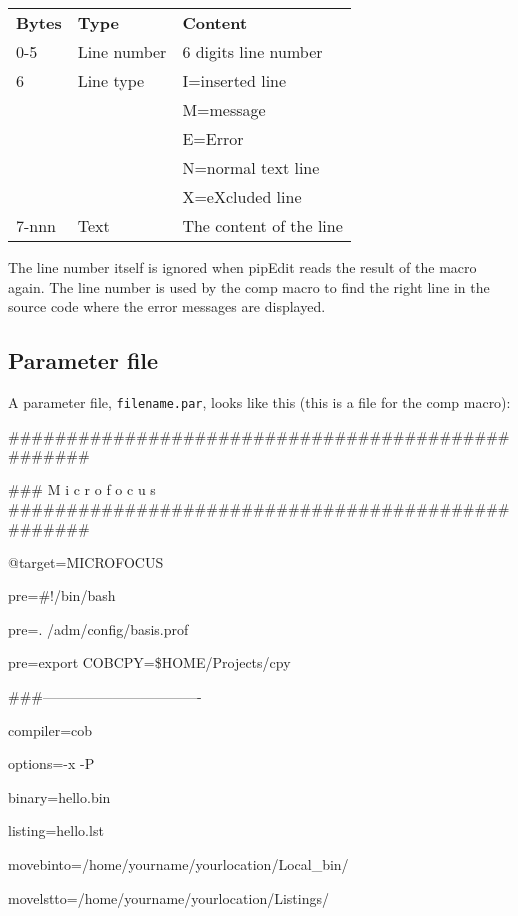 \documentclass{report}
\begin{document}
\begin{tabular}{l l l}
\textbf{Bytes} & \textbf{Type}        & \textbf{Content} \\
0-5            & Line number          & 6 digits line number \\
6              & Line type            & I=inserted line \\
               &                      & M=message\\
               &                      & E=Error \\
               &                      & N=normal text line \\
               &                      & X=eXcluded line \\
7-nnn          & Text                 & The content of the line \\
\end{tabular}


The line number itself is ignored when pipEdit reads the result of the macro again. The line number is used by the comp macro to find the right line in the source code where the error messages are displayed.

\pagebreak
\subsection{Parameter file}
A parameter file, \texttt{filename.par}, looks like this (this is a file for the comp macro):

\#\#\#\#\#\#\#\#\#\#\#\#\#\#\#\#\#\#\#\#\#\#\#\#\#\#\#\#\#\#\#\#\#\#\#\#\#\#\#\#\#\#\#\#\#\#\#\#\#\#

\#\#\# M i c r o f o c u s \#\#\#\#\#\#\#\#\#\#\#\#\#\#\#\#\#\#\#\#\#\#\#\#\#\#\#\#\#\#\#\#\#\#\#\#\#\#\#\#\#\#\#\#\#\#\#\#\#\#

@target=MICROFOCUS

pre=\#!/bin/bash

pre=. /adm/config/basis.prof

pre=export COBCPY=\$HOME/Projects/cpy

\#\#\#----------------------------------

compiler=cob

options=-x -P

binary=hello.bin

listing=hello.lst

movebinto=/home/yourname/yourlocation/Local\_bin/

movelstto=/home/yourname/yourlocation/Listings/
\end{document}
